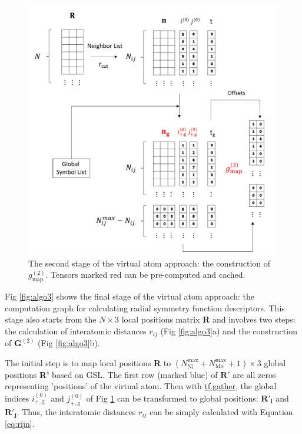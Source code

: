 \documentclass[prb,preprint]{revtex4-2}
\begin{document}
\begin{figure}[h!]
\centering
\includegraphics[scale=0.6]{figures/Fig2-v2gmap.pdf}
\caption{\label{fig:algo2} The second stage of the virtual atom approach: the 
construction of $g_{\mathrm{map}}^{(2)}$. Tensors marked red can be pre-computed 
and cached.}
\end{figure}

Fig \ref{fig:algo3} shows the final stage of the virtual atom approach: the 
computation graph for calculating radial symmetry function descriptors. This 
stage also starts from the $N \times 3$ local positions matrix \textbf{R} and 
involves two steps: the calculation of interatomic distances $r_{ij}$ 
(Fig \ref{fig:algo3}a) and the construction of $\mathbf{G}^{(2)}$ 
(Fig \ref{fig:algo3}b).

The initial step is to map local positions \textbf{R} to
$(N_{\mathrm{Ni}}^{\mathrm{max}}+N_{\mathrm{Mo}}^{\mathrm{max}}+1) \times 3$
global positions \textbf{R'} based on GSL. The first row (marked blue) of 
$\mathbf{R'}$ are all zeros representing 'positions' of the virtual atom. 
Then with 
\href{https://www.tensorflow.org/versions/r1.12/api_docs/python/tf/gather}
{tf.gather}, the global indices $i^{(0)}_{\mathrm{+,g}}$ and 
$j^{(0)}_{\mathrm{+,g}}$ of Fig \ref{fig:algo2} can be transformed to global 
positions: $\mathbf{R'_i}$ and $\mathbf{R'_j}$. Thus, the interatomic distances 
$r_{ij}$ can be simply calculated with Equation \ref{eq:rijn}.
\end{document}
